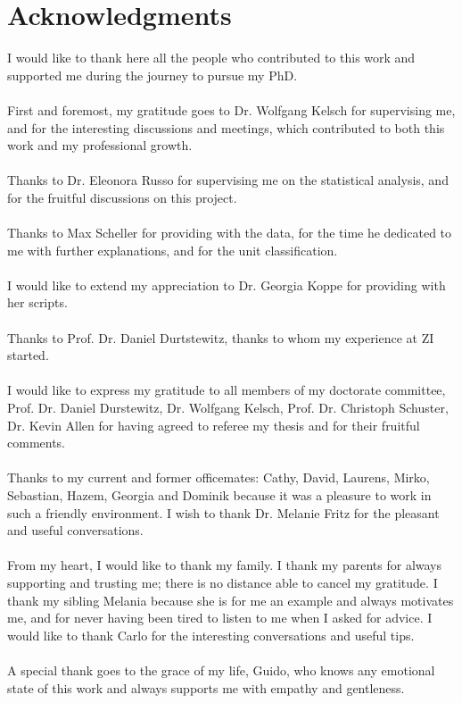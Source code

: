 \chapter*{Acknowledgments}
\label{Acknowledgments}
\markboth{}{}
I would like to thank here all the people who contributed to this work and supported me during the journey to pursue my PhD.\\\\
First and foremost, my gratitude goes to Dr. Wolfgang Kelsch for supervising me, and for the interesting discussions and meetings, which contributed to both this work and my professional growth.\\\\
Thanks to Dr. Eleonora Russo for supervising me on the statistical analysis, and for the fruitful discussions on this project.\\\\
Thanks to Max Scheller for providing with the data, for the time he dedicated to me with further explanations, and for the unit classification.\\\\
I would like to extend my appreciation to Dr. Georgia Koppe for providing with her scripts.\\\\
Thanks to Prof. Dr. Daniel Durtstewitz, thanks to whom my experience at ZI started.\\\\
I would like to express my gratitude to all members of my doctorate committee, Prof. Dr. Daniel Durstewitz, Dr. Wolfgang Kelsch, Prof. Dr. Christoph Schuster, Dr. Kevin Allen for having agreed to referee my thesis and for their fruitful comments.\\\\
Thanks to my current and former officemates: Cathy, David, Laurens, Mirko, Sebastian, Hazem, Georgia and Dominik because it was a pleasure to work in such a friendly environment. I wish to thank Dr. Melanie Fritz for the pleasant and useful conversations.\\\\
From my heart, I would like to thank my family. I thank my parents for always supporting and trusting me; there is no distance able to cancel my gratitude. I thank my sibling Melania because she is for me an example and always motivates me, and for never having been tired to listen to me when I asked for advice. I would like to thank Carlo for the interesting conversations and useful tips.\\\\
A special thank goes to the grace of my life, Guido, who knows any emotional state of this work and always supports me with empathy and gentleness.
